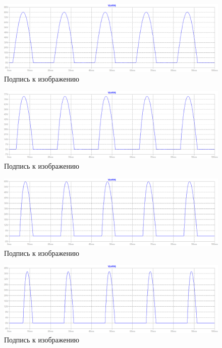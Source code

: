 \documentclass[a4paper, 12pt]{article}
\begin{document}
    \begin{figure}[H]
        \centering
        \includegraphics[scale=0.45]{a30_L20m.png}
        \captionsetup{skip=0pt}
        \caption{Подпись к изображению}
        \label{fig:a30_L20m}
    \end{figure}
    \begin{figure}[H]
        \centering
        \includegraphics[scale=0.45]{a60_L20m.png}
        \captionsetup{skip=0pt}
        \caption{Подпись к изображению}
        \label{fig:a60_L20m}
    \end{figure}
    \begin{figure}[H]
        \centering
        \includegraphics[scale=0.45]{a90_L20m.png}
        \captionsetup{skip=0pt}
        \caption{Подпись к изображению}
        \label{fig:a90_L20m}
    \end{figure}
    \begin{figure}[H]
        \centering
        \includegraphics[scale=0.45]{a120_L20m.png}
        \captionsetup{skip=0pt}
        \caption{Подпись к изображению}
        \label{fig:a120_L20m}
    \end{figure}
\end{document}
